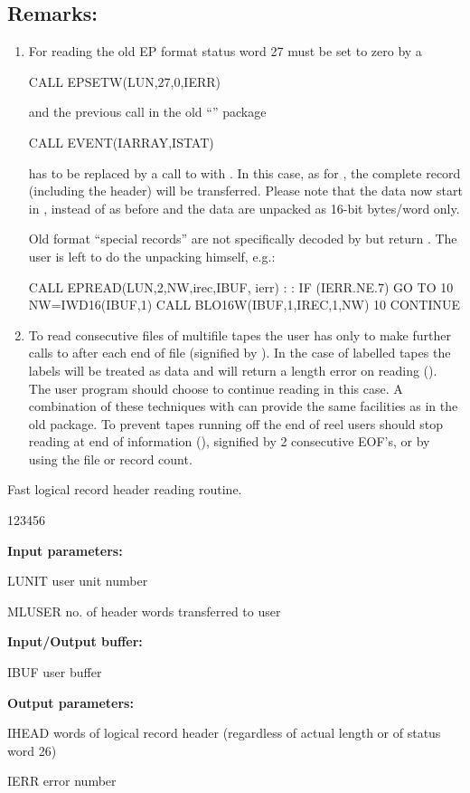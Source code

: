 \subsection*{Remarks:}
\begin{enumerate}
\item For reading the old EP format status word 27 must be set to zero by a
\begin{XMP}
             CALL EPSETW(LUN,27,0,IERR)
\end{XMP}
and the previous call in the old ``'' package
\begin{XMP}
             CALL EVENT(IARRAY,ISTAT)
\end{XMP}
has to be replaced by a call to  with . 
In this case, as for , the complete record 
(including the header) will be transferred. 
Please note that the  data  now  start  in  ,
instead of  as before and the data are unpacked as 16-bit
bytes/word only.
 
Old format ``special records'' are not specifically decoded by
 but return . 
The user is left to do the unpacking himself, e.g.:
\begin{XMP}
    CALL EPREAD(LUN,2,NW,irec,IBUF, ierr)
    :
    :
    IF (IERR.NE.7) GO TO 10
    NW=IWD16(IBUF,1)
    CALL BLO16W(IBUF,1,IREC,1,NW)
   10 CONTINUE
\end{XMP}
\item To read consecutive files of multifile tapes the user has only
to make further calls to  after each end of file (signified by
). 
In the case of labelled tapes the labels will be treated as
data and  will return a length error on reading (). 
The user program should choose to continue reading in this case. 
A combination of
these techniques with  can provide the same facilities as
 in the old package. 
To prevent tapes running off the end of reel
users should stop reading at end of information (), signified by 2
consecutive EOF's, or by using the file or record count.
\end{enumerate}

 
Fast logical record header reading routine.
 
\begin{DLtt}{123456}
\item[{\rm\bf Input parameters:}]
\item[LUNIT] user unit number
\item[MLUSER] no. of header words transferred to user
\item[{\rm\bf Input/Output buffer:}]
\item[IBUF] user buffer
\item[{\rm\bf Output parameters:}]
\item[IHEAD]  words of logical record header (regardless of actual
             length or of status word 26)
\item[IERR] error number
\end{DLtt}

